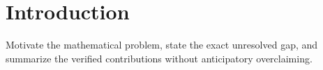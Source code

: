 \section{Introduction}
Motivate the mathematical problem, state the exact unresolved gap, and summarize the verified contributions without anticipatory overclaiming.
